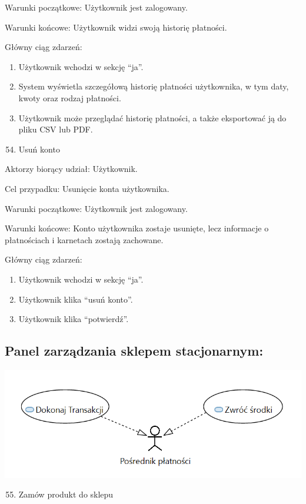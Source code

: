 \documentclass[
]{article}
\providecommand{\tightlist}{%
  \setlength{\itemsep}{0pt}\setlength{\parskip}{0pt}}
\begin{document}
{Warunki początkowe: Użytkownik jest zalogowany.}

{Warunki końcowe: Użytkownik widzi swoją historię płatności.}

{Główny ciąg zdarzeń:}

\begin{enumerate}
\tightlist
\item
  {Użytkownik wchodzi w sekcję ``ja''.}
\item
  {System wyświetla szczegółową historię płatności użytkownika, w tym
  daty, kwoty oraz rodzaj płatności.}
\item
  {Użytkownik może przeglądać historię płatności, a także eksportować ją
  do pliku CSV lub PDF.}
\end{enumerate}

{}

\begin{enumerate}
\setcounter{enumi}{53}
\tightlist
\item
  {Usuń konto}
\end{enumerate}

{Aktorzy biorący udział: Użytkownik.}

{Cel przypadku: Usunięcie konta użytkownika.}

{Warunki początkowe: Użytkownik jest zalogowany.}

{Warunki końcowe: Konto użytkownika zostaje usunięte, lecz informacje o
płatnościach i karnetach zostają zachowane.}

{Główny ciąg zdarzeń:}

\begin{enumerate}
\tightlist
\item
  {Użytkownik wchodzi w sekcję ``ja''.}
\item
  {Użytkownik klika ``usuń konto''.}
\item
  {Użytkownik klika ``potwierdź''.}
\end{enumerate}



\hypertarget{h.q7tyc5bsqba0}{%
\subsection{\texorpdfstring{{Panel zarządzania sklepem
stacjonarnym:}}{Panel zarządzania sklepem stacjonarnym:}}\label{h.q7tyc5bsqba0}}
{\includegraphics{diagrams/use_cases/posrednik_platnosci.png}}
\begin{enumerate}
\setcounter{enumi}{54}
\tightlist
\item
  {Zamów produkt do sklepu}
\end{enumerate}
\end{document}
